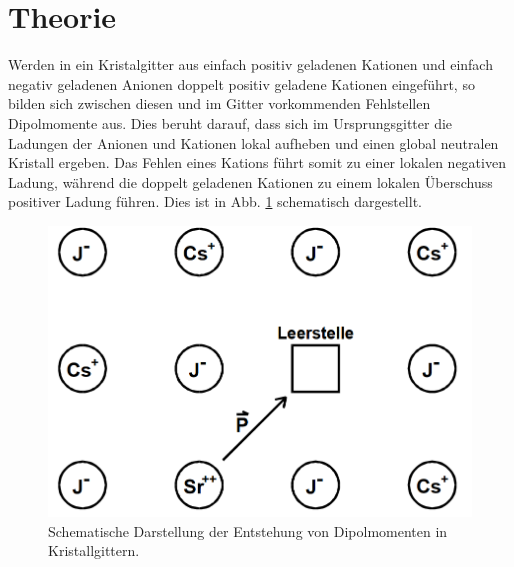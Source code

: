 \section{Theorie}
\label{sec:Theorie}

Werden in ein Kristalgitter aus einfach positiv geladenen Kationen und einfach negativ geladenen Anionen doppelt positiv geladene Kationen eingeführt, so bilden sich zwischen diesen und im Gitter vorkommenden Fehlstellen Dipolmomente aus. Dies beruht darauf, dass sich im Ursprungsgitter die Ladungen der Anionen und Kationen lokal aufheben und einen global neutralen Kristall ergeben. Das Fehlen eines Kations führt somit zu einer lokalen negativen Ladung, während die doppelt geladenen Kationen zu einem lokalen Überschuss positiver Ladung führen. Dies ist in Abb. \ref{fig:fehlstelle} schematisch dargestellt.

\begin{figure}
  \centering
  \includegraphics{./logos/Fehlstelle.PNG}
  \caption{Schematische Darstellung der Entstehung von Dipolmomenten in Kristallgittern.\cite{Anleitung}}
  \label{fig:fehlstelle}
\end{figure}

